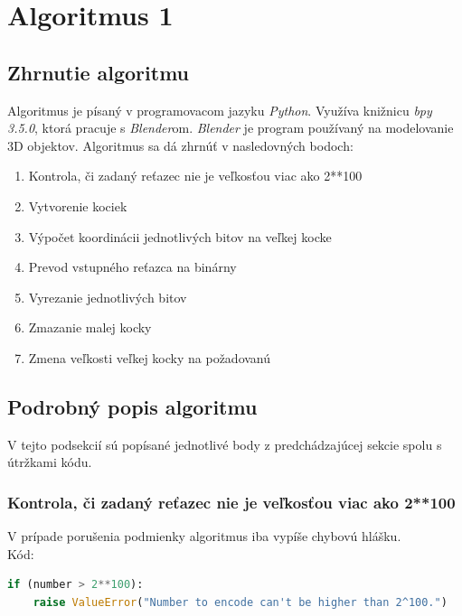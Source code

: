 \section{Algoritmus 1}
\subsection{Zhrnutie algoritmu}
Algoritmus je písaný v programovacom jazyku \textit{Python}. Využíva knižnicu \textit{bpy 3.5.0}, ktorá pracuje s \textit{Blender}om. \textit{Blender} je program používaný na modelovanie 3D objektov. Algoritmus sa dá zhrnúť v nasledovných bodoch:
\begin{enumerate}
    \item Kontrola, či zadaný reťazec nie je veľkosťou viac ako 2**100
    \item Vytvorenie kociek
    \item Výpočet koordinácii jednotlivých bitov na veľkej kocke
    \item Prevod vstupného reťazca na binárny 
    \item Vyrezanie jednotlivých bitov
    \item Zmazanie malej kocky
    \item Zmena veľkosti veľkej kocky na požadovanú
\end{enumerate}


\subsection{Podrobný popis algoritmu}
V tejto podsekcií sú popísané jednotlivé body z predchádzajúcej sekcie spolu s útržkami kódu.

\subsubsection{Kontrola, či zadaný reťazec nie je veľkosťou viac ako 2**100}
V prípade porušenia podmienky algoritmus iba vypíše chybovú hlášku.
\\Kód:
\begin{lstlisting}[language=Python]
if (number > 2**100):
    raise ValueError("Number to encode can't be higher than 2^100.")
\end{lstlisting}

